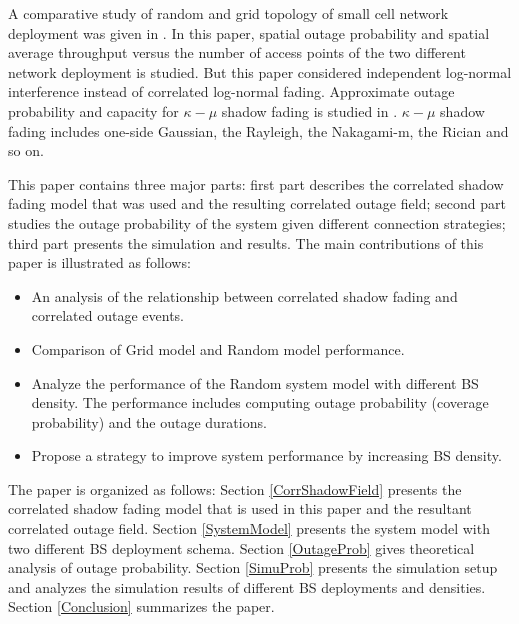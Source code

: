 \documentclass[journal,comsoc]{IEEEtran}
\begin{document}
\par A comparative study of random and grid topology of small cell network deployment was given in \cite{chen2012small}. In this paper, spatial outage probability and spatial average throughput versus the number of access points of the two different network deployment is studied. But this paper considered independent log-normal interference instead of correlated log-normal fading. Approximate outage probability and capacity for $\kappa-\mu$ shadow fading is studied in \cite{kumar2015approximate}. $\kappa-\mu$ shadow fading includes one-side Gaussian, the Rayleigh, the Nakagami-m, the Rician and so on.


\par This paper contains three major parts: first part describes the correlated shadow fading model that was used and the resulting correlated outage field; second part studies the outage probability of the system given different connection strategies; third part presents the simulation and results. The main contributions of this paper is illustrated as follows:
\begin{itemize}
\item An analysis of the relationship between correlated shadow fading and correlated outage events.
\item Comparison of Grid model and Random model performance.
\item Analyze the performance of the Random system model with different BS density. The performance includes computing outage probability (coverage probability) and the outage durations.
\item Propose a strategy to improve system performance by increasing BS density.
\end{itemize}
The paper is organized as follows: Section \ref{CorrShadowField} presents the correlated shadow fading model that is used in this paper and the resultant correlated outage field. Section \ref{SystemModel} presents the system model with two different BS deployment schema. Section \ref{OutageProb} gives theoretical analysis of outage probability. Section \ref{SimuProb} presents the simulation setup and analyzes the simulation results of different BS deployments and densities. Section \ref{Conclusion} summarizes the paper.
\end{document}
